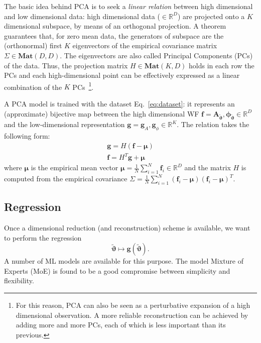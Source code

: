 \documentclass[twocolumn,showpacs,preprintnumbers,nofootinbib,prd,
superscriptaddress,10pt]{revtex4-1}
\newcommand{\R}{\mathbb{R}}
\begin{document}
The basic idea behind PCA is to seek a \textit{linear relation} between high dimensional and low dimensional data: high dimensional data ($\in \R^D$) are projected onto a $K$ dimensional subspace, by means of an orthogonal projection.
A theorem~\cite[Sec. 12.2.1]{murphy2012machine} guarantees that, for zero mean data, the generators of subspace are the (orthonormal) first $K$ eigenvectors of the empirical covariance matrix $\Sigma \in \mathbf{Mat}(D,D)$. The eigenvectors are also called Principal Components (PCs) of the data.
Thus, the projection matrix $H\in \mathbf{Mat}(K,D)$ holds in each row the PCs and each high-dimensional point can be effectively expressed as a linear combination of the $K$ PCs~\footnote{For this reason, PCA can also be seen as a perturbative expansion of a high dimensional observation. A more reliable reconstruction can be achieved by adding more and more PCs, each of which is less important than its previous.}.

A PCA model is trained with the dataset Eq.~\eqref{eq:dataset}: it represents an (approximate) bijective map between the high dimensional WF $\mathbf{f} = \boldsymbol{A}_{\tilde{\boldsymbol{\vartheta}}}, \boldsymbol{\phi}_{\tilde{\boldsymbol{\vartheta}}} \in \R^D$ and the low-dimensional representation $\mathbf{g} = \mathbf{g}_A , \mathbf{g}_\phi \in \R^K$.
The relation takes the following form:
\begin{align}
	\mathbf{g} = H (\mathbf{f} - \boldsymbol{\mu}) \label{eq:PCA_reduction_model}\\
	\mathbf{f} = H^T \mathbf{g} + \boldsymbol{\mu} \label{eq:PCA_reconstruction_model}
\end{align}
where $\boldsymbol{\mu}$ is the empirical mean vector ${\boldsymbol{\mu} = \frac{1}{N} \sum_{i=1}^N \boldsymbol{f}_i \in \R^D}$ and the matrix $H$ is computed from the empirical covariance ${\Sigma = \frac{1}{N} \sum_{i=1}^N (\mathbf{f}_i-\boldsymbol{\mu}) (\mathbf{f}_i-\boldsymbol{\mu})^T}$.


\subsection{Regression}
Once a dimensional reduction (and reconstruction) scheme is available, we want to perform the regression
\begin{equation} \label{eq:regression_model}
	{\tilde{\boldsymbol{\vartheta}}} \longmapsto \boldsymbol{g}({\tilde{\boldsymbol{\vartheta}}}).
\end{equation}
A number of ML models are available for this purpose. The model Mixture of Experts (MoE) \cite{Jacobs1991AdaptiveMoE} \cite[ch. 11]{murphy2012machine} is found to be a good compromise between simplicity and flexibility.
\end{document}
